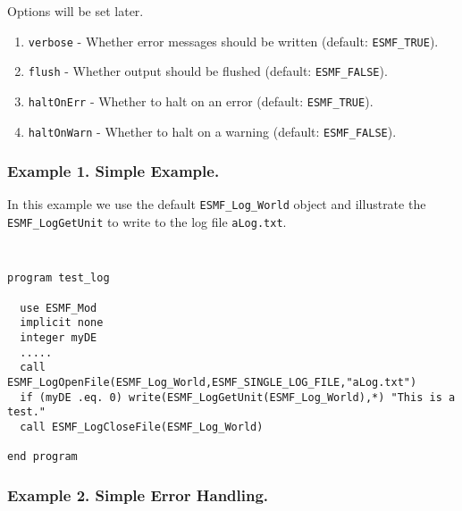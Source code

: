 %


Options will be set later.
\begin{enumerate}
\item {\tt verbose} - Whether error messages should be written (default: {\tt ESMF\_TRUE}).
\item {\tt flush} - Whether output should be flushed (default:  {\tt ESMF\_FALSE}).
\item {\tt haltOnErr} - Whether to halt on an error (default:  {\tt ESMF\_TRUE}).
\item {\tt haltOnWarn} - Whether to halt on a warning (default:  {\tt ESMF\_FALSE}).
\end {enumerate}

\subsubsection{Example 1. Simple Example.}

In this example we use the default {\tt ESMF\_Log\_World} object and 
illustrate the {\tt ESMF\_LogGetUnit} to write to the log file 
{\tt aLog.txt}.

{\tt
\begin{verbatim}
program test_log

  use ESMF_Mod
  implicit none
  integer myDE
  .....
  call ESMF_LogOpenFile(ESMF_Log_World,ESMF_SINGLE_LOG_FILE,"aLog.txt")
  if (myDE .eq. 0) write(ESMF_LogGetUnit(ESMF_Log_World),*) "This is a test."
  call ESMF_LogCloseFile(ESMF_Log_World)

end program
\end{verbatim}
\tt}

\subsubsection{Example 2. Simple Error Handling.}


